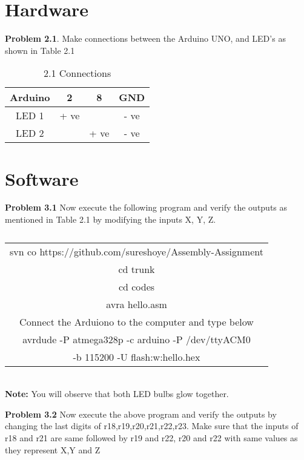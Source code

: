 \documentclass[journal,12pt,twocolumn]{IEEEtran}
\begin{document}
\section{Hardware}


\textbf{Problem 2.1}. Make connections between the Arduino UNO, and LED's as shown in Table 2.1 \\


\begin{table}[h]
    \centering
    \begin{tabular}{| c | c | c | c |}
        \hline
         Arduino & 2 & 8 & GND  \\
       \hline
       LED 1 & + ve &  & - ve  \\
        \hline
      LED 2 &  & + ve & - ve  \\
        \hline
         
         \hline
    \end{tabular}
    \caption{2.1 Connections}
\end{table}

\section{Software}

\textbf{Problem 3.1} Now execute the following program and verify the outputs as mentioned in Table 2.1 by modifying the inputs X, Y, Z.\\
\begin{table}[h]
    \centering
    \begin{tabular}{| c |}
    \hline
    svn co https://github.com/sureshoye/Assembly-Assignment\\
    	cd trunk \\

	cd codes \\
	
	avra hello.asm \\
	
	Connect the Arduiono to the computer and type below\\
	avrdude -P atmega328p -c arduino -P /dev/ttyACM0 \\-b 115200 -U flash:w:hello.hex\\
    
    \hline
    \end{tabular}
    \caption{}
    \label{}
 \end{table}
 \\
\textbf{Note:} You will observe that both LED bulbs glow together.

\textbf{Problem 3.2} Now execute the above program and verify the outputs by changing the last digits of r18,r19,r20,r21,r22,r23. Make sure that the inputs of r18 and r21 are same followed by r19 and r22, r20 and r22 with same values as they represent X,Y and Z \\
\end{document}
